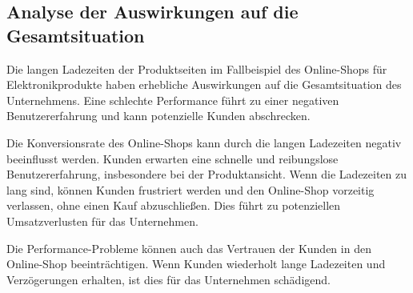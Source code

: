 \subsection{Analyse der Auswirkungen auf die Gesamtsituation}

Die langen Ladezeiten der Produktseiten im Fallbeispiel des Online-Shops für Elektronikprodukte haben erhebliche Auswirkungen auf die Gesamtsituation des Unternehmens. Eine schlechte Performance führt zu einer negativen Benutzererfahrung und kann potenzielle Kunden abschrecken.

Die Konversionsrate des Online-Shops kann durch die langen Ladezeiten negativ beeinflusst werden. Kunden erwarten eine schnelle und reibungslose Benutzererfahrung, insbesondere bei der Produktansicht. Wenn die Ladezeiten zu lang sind, können Kunden frustriert werden und den Online-Shop vorzeitig verlassen, ohne einen Kauf abzuschließen. Dies führt zu potenziellen Umsatzverlusten für das Unternehmen.

Die Performance-Probleme können auch das Vertrauen der Kunden in den Online-Shop beeinträchtigen. Wenn Kunden wiederholt lange Ladezeiten und Verzögerungen erhalten, ist dies für das Unternehmen schädigend.
